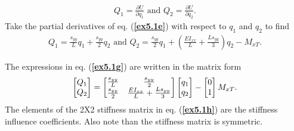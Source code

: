 \documentclass{AeroStructure-ERJohnson}
\begin{document}
\begin{example}
\begin{align}\label{ex5.1f}
Q_{1}=\frac{\partial U}{\partial q_{1}}\mbox{ and }Q_{2}=\frac{\partial U}{\partial q_{2}}.
\end{align}
Take the partial derivatives of eq. ({\bf\ref{ex5.1e}}) with respect to $q_{1}$ and $q_{2}$ to find
\begin{align}\label{ex5.1g}
Q_{1}=\frac{s_{y y}}{L} q_{1}+\frac{s_{y y}}{2} q_{2}\mbox{ and }Q_{2}=\frac{s_{y y}}{2} q_{1}+\left(\frac{E I_{x x}}{L}+\frac{L s_{y y}}{3}\right) q_{2}-M_{x T}.
\end{align}
\vspace*{5pt}
\clearpage

\noindent The expressions in eq. ({\bf\ref{ex5.1g}}) are written in the matrix form
\begin{align}\label{ex5.1h}
\left[\begin{array}{@{}l@{}}Q_{1} \\Q_{2}\end{array}\right]=\left[\begin{array}{@{}cc@{}}\frac{s_{y y}}{L} & \frac{s_{y y}}{2} \\\frac{s_{y y}}{2} & \frac{E I_{x x}}{L}+\frac{L s_{y y}}{3}\end{array}\right]\left[\begin{array}{@{}l@{}}q_{1} \\q_{2}\end{array}\right]-\left[\begin{array}{@{}l@{}}0 \\1\end{array}\right] M_{x T}.
\end{align}
The elements of the 2X2 stiffness matrix in eq. ({\bf\ref{ex5.1h}}) are the stiffness influence coefficients. Also note than the stiffness matrix is symmetric.


\end{example}
\end{document}
